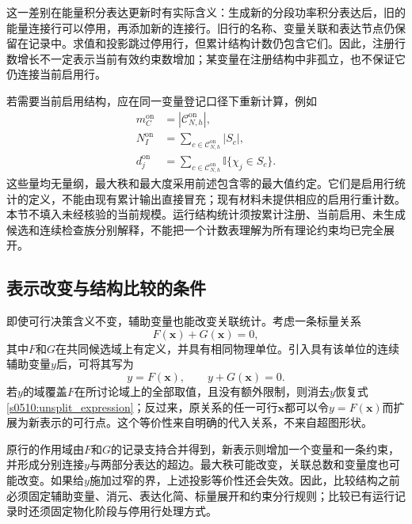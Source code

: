 这一差别在能量积分表达更新时有实际含义：生成新的分段功率积分表达后，旧的能量连接行可以停用，再添加新的连接行。旧行的名称、变量关联和表达节点仍保留在记录中。求值和投影跳过停用行，但累计结构计数仍包含它们。因此，注册行数增长不一定表示当前有效约束数增加；某变量在注册结构中非孤立，也不保证它仍连接当前启用行。

若需要当前启用结构，应在同一变量登记口径下重新计算，例如
\begin{align}
 m_C^{\mathrm{on}}
 &=|\mathcal C_{N,h}^{\mathrm{on}}|,\\
 N_I^{\mathrm{on}}
 &=\sum_{c\in\mathcal C_{N,h}^{\mathrm{on}}}|S_c|,\\
 d_j^{\mathrm{on}}
 &=\sum_{c\in\mathcal C_{N,h}^{\mathrm{on}}}
       \mathbb I\{\chi_j\in S_c\}.
 \label{s0510:enabled_statistics}
\end{align}
这些量均无量纲，最大秩和最大度采用前述包含零的最大值约定。它们是启用行统计的定义，不能由现有累计输出直接冒充；现有材料未提供相应的启用行重计数。本节不填入未经核验的当前规模。运行结构统计须按累计注册、当前启用、未生成候选和连续检查族分别解释，不能把一个计数表理解为所有理论约束均已完全展开。

\subsection{表示改变与结构比较的条件}

即使可行决策含义不变，辅助变量也能改变关联统计。考虑一条标量关系
\begin{equation}
 F(\mathbf x)+G(\mathbf x)=0,
 \label{s0510:unsplit_expression}
\end{equation}
其中$F$和$G$在共同候选域上有定义，并具有相同物理单位。引入具有该单位的连续辅助变量$y$后，可将其写为
\begin{equation}
 y=F(\mathbf x),\qquad y+G(\mathbf x)=0.
 \label{s0510:auxiliary_expression}
\end{equation}
若$y$的域覆盖$F$在所讨论域上的全部取值，且没有额外限制，则消去$y$恢复式\eqref{s0510:unsplit_expression}；反过来，原关系的任一可行$\mathbf x$都可以令$y=F(\mathbf x)$而扩展为新表示的可行点。这个等价性来自明确的代入关系，不来自超图形状。

原行的作用域由$F$和$G$的记录支持合并得到，新表示则增加一个变量和一条约束，并形成分别连接$y$与两部分表达的超边。最大秩可能改变，关联总数和变量度也可能改变。如果给$y$施加过窄的界，上述投影等价性还会失效。因此，比较结构之前必须固定辅助变量、消元、表达化简、标量展开和约束分行规则；比较已有运行记录时还须固定物化阶段与停用行处理方式。

